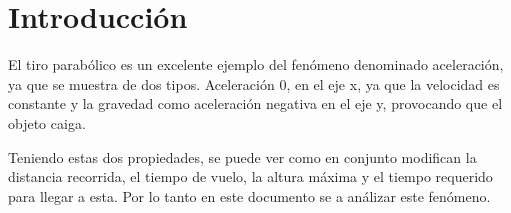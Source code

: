 \section{Introducción}
\label{sec:introduccion}



El tiro parabólico es un excelente ejemplo del fenómeno denominado aceleración,
ya que se muestra de dos tipos. Aceleración 0, en el eje x, ya que la velocidad
es constante y la gravedad como aceleración negativa en el eje y, provocando
que el objeto caiga.


Teniendo estas dos propiedades, se puede ver como en conjunto modifican la
distancia recorrida, el tiempo de vuelo, la altura máxima y el tiempo requerido
para llegar a esta. Por lo tanto en este documento se a análizar este fenómeno.
